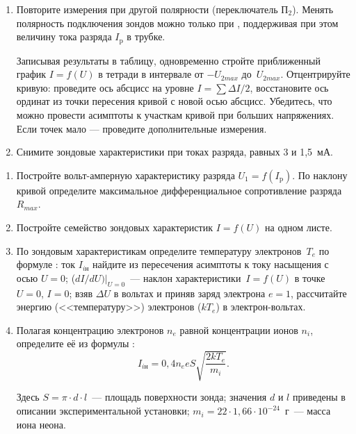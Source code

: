 \begin{lab:task}
\begin{enumerate}
\item Повторите измерения при другой полярности (переключатель $\text{П}_2$). Менять полярность подключения зондов можно только при , поддерживая при этом величину тока разряда $I_\text{p}$ в трубке.

Записывая результаты в таблицу, одновременно стройте приближенный график $I=f(U)$  в тетради в интервале от $-U_{2 max}$ до~$U_{2 max}$. Отцентрируйте кривую: проведите ось абсцисс на уровне $I=\sum \Delta I/2$, восстановите ось ординат из точки пересения кривой с новой осью абсцисс. Убедитесь, что можно провести асимптоты к участкам кривой при больших напряжениях. Если точек мало --- проведите дополнительные измерения.

\item Снимите зондовые характеристики при токах разряда, равных 3 и 1,5~мА.
 \end{enumerate}


 \begin{enumerate}

\item Постройте вольт-амперную характеристику разряда $U_{1}=f(I_\text{p})$. По наклону кривой определите максимальное дифференциальное сопротивление разряда $R_{max}$.

\item Постройте семейство зондовых характеристик $I=f(U)$ на одном листе.

\item По зондовым характеристикам определите температуру электронов~$T_{e}$ по формуле : ток $I_{i\text{н}}$ найдите из пересечения асимптоты к току насыщения с осью $U=0$; ($dI/dU)|_{U=0}$~--- наклон
характеристики~$I=f(U)$ в точке $U=0$, $I=0$; взяв $\Delta U$ в вольтах и приняв заряд электрона $e=1$, рассчитайте
энергию (<<температуру>>) электронов ($kT_{e}$) в электрон-вольтах.

\item Полагая концентрацию электронов $n_{e}$ равной концентрации ионов $n_{i}$, определите её из формулы :
\begin{equation}
	I_{i\text{н}}=0,4n_{e}eS\sqrt{\frac{2kT_{e}}{m_{i}}}.
\end{equation}

Здесь $S=\pi\cdot d\cdot l$~--- площадь поверхности зонда; значения $d$ и $l$ приведены в описании экспериментальной
установки; $m_i=22\cdot 1,66\cdot 10^{-24}$~г~--- масса иона неона.


\end{enumerate}
\end{lab:task}
